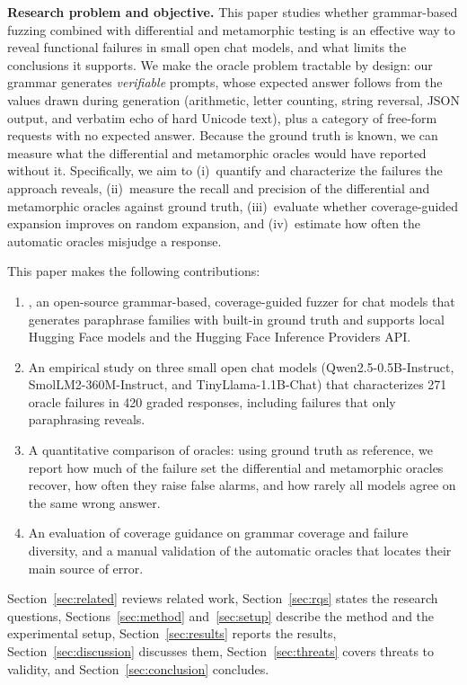 \textbf{Research problem and objective.} This paper studies whether grammar-based fuzzing combined with differential and metamorphic testing is an effective way to reveal functional failures in small open chat models, and what limits the conclusions it supports. We make the oracle problem tractable by design: our grammar generates \emph{verifiable} prompts, whose expected answer follows from the values drawn during generation (arithmetic, letter counting, string reversal, JSON output, and verbatim echo of hard Unicode text), plus a category of free-form requests with no expected answer. Because the ground truth is known, we can measure what the differential and metamorphic oracles would have reported without it. Specifically, we aim to (i)~quantify and characterize the failures the approach reveals, (ii)~measure the recall and precision of the differential and metamorphic oracles against ground truth, (iii)~evaluate whether coverage-guided expansion improves on random expansion, and (iv)~estimate how often the automatic oracles misjudge a response.

This paper makes the following contributions:
\begin{enumerate}
  \item {}, an open-source grammar-based, coverage-guided fuzzer for chat models that generates paraphrase families with built-in ground truth and supports local Hugging Face models and the Hugging Face Inference Providers API.
  \item An empirical study on three small open chat models (Qwen2.5-0.5B-Instruct, SmolLM2-360M-Instruct, and TinyLlama-1.1B-Chat) that characterizes 271 oracle failures in 420 graded responses, including failures that only paraphrasing reveals.
  \item A quantitative comparison of oracles: using ground truth as reference, we report how much of the failure set the differential and metamorphic oracles recover, how often they raise false alarms, and how rarely all models agree on the same wrong answer.
  \item An evaluation of coverage guidance on grammar coverage and failure diversity, and a manual validation of the automatic oracles that locates their main source of error.
\end{enumerate}

Section~\ref{sec:related} reviews related work, Section~\ref{sec:rqs} states the research questions, Sections~\ref{sec:method} and~\ref{sec:setup} describe the method and the experimental setup, Section~\ref{sec:results} reports the results, Section~\ref{sec:discussion} discusses them, Section~\ref{sec:threats} covers threats to validity, and Section~\ref{sec:conclusion} concludes.
